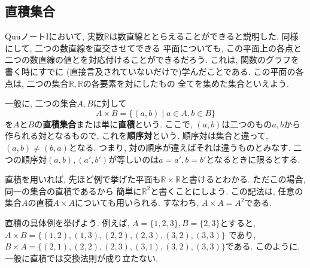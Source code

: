     \subsection{直積集合}
        QuuノートIにおいて, 実数$\mathbb{R}$は数直線ととらえることができると説明した. 同様にして, 二つの数直線を直交させてできる
        平面についても, この平面上の各点と二つの数直線の値とを対応付けることができるだろう. これは, 関数のグラフを書く時にすでに
        (直接言及されていないだけで)学んだことである. この平面の各点は, 二つの集合$\mathbb{R},\mathbb{R}$の各要素を対にしたもの
        全てを集めた集合といえよう.
        \begin{figure*}[h]
            \centering
        \end{figure*}

        一般に, 二つの集合$A,B$に対して
        \begin{equation}
            A\times B =\{(a,b)\mid a\in A,b\in B\} \label{eq:集合論基礎:直積の定義}
        \end{equation}
        を$A$と$B$の\textbf{直積集合}または単に\textbf{直積}という. ここで, $(a,b)$は二つのもの$a,b$から作られる対となるもので, 
        これを\textbf{順序対}という. 順序対は集合と違って, $(a,b)\neq (b,a)$となる. つまり, 対の順序が違えばそれは違うものとみなす.
        二つの順序対$(a,b),(a',b')$が等しいのは$a=a',b=b'$となるときに限るとする. 

        直積を用いれば, 先ほど例で挙げた平面も$\mathbb{R}\times \mathbb{R}$と書けるとわかる. ただこの場合, 同一の集合の直積であるから
        簡単に$\mathbb{R}^2$と書くことにしよう. この記法は, 任意の集合$A$の直積$A\times A$についても用いられる. すなわち, $A\times A=A^2$である.

        直積の具体例を挙げよう. 例えば, $A=\{1,2,3\},B=\{2,3\}$とすると, $A\times B=\{(1,2),(1,3),(2,2),(2,3),(3,2),(3,3)\}$
        であり, $B\times A = \{(2,1),(2,2),(2,3),(3,1),(3,2),(3,3)\}$である. このように, 一般に直積では交換法則が成り立たない.

